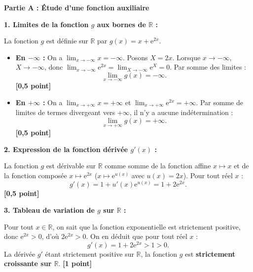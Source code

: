 \documentclass[11pt,a4paper]{article}
\newcommand{\R}{\mathbb{R}}
\newcommand{\e}{\mathrm{e}}
\begin{document}
\begin{correctionbox}
\textbf{Partie A : Étude d'une fonction auxiliaire}

\textbf{1. Limites de la fonction $g$ aux bornes de $\R$ :}

La fonction $g$ est définie sur $\R$ par $g(x) = x + \e^{2x}$.
\begin{itemize}[leftmargin=*]
    \item \textbf{En $-\infty$ :} On a $\lim_{x \to -\infty} x = -\infty$.
    Posons $X = 2x$. Lorsque $x \to -\infty$, $X \to -\infty$, donc $\lim_{x \to -\infty} \e^{2x} = \lim_{X \to -\infty} \e^X = 0$.
    Par somme des limites :
    \[
    \lim_{x \to -\infty} g(x) = -\infty.
    \] \hfill \textbf{[0{,}5 point]}
    \item \textbf{En $+\infty$ :} On a $\lim_{x \to +\infty} x = +\infty$ et $\lim_{x \to +\infty} \e^{2x} = +\infty$.
    Par somme de limites de termes divergeant vers $+\infty$, il n'y a aucune indétermination :
    \[
    \lim_{x \to +\infty} g(x) = +\infty.
    \] \hfill \textbf{[0{,}5 point]}
\end{itemize}

\medskip
\textbf{2. Expression de la fonction dérivée $g'(x)$ :}

La fonction $g$ est dérivable sur $\R$ comme somme de la fonction affine $x \mapsto x$ et de la fonction composée $x \mapsto \e^{2x}$ ($x \mapsto \e^{u(x)}$ avec $u(x) = 2x$).
Pour tout réel $x$ :
\[
g'(x) = 1 + u'(x)\e^{u(x)} = 1 + 2\e^{2x}.
\] \hfill \textbf{[0{,}5 point]}

\medskip
\textbf{3. Tableau de variation de $g$ sur $\R$ :}

Pour tout $x \in \R$, on sait que la fonction exponentielle est strictement positive, donc $\e^{2x} > 0$, d'où $2\e^{2x} > 0$.
On en déduit que pour tout réel $x$ :
\[
g'(x) = 1 + 2\e^{2x} > 1 > 0.
\]
La dérivée $g'$ étant strictement positive sur $\R$, la fonction $g$ est \textbf{strictement croissante sur $\R$}. \hfill \textbf{[1 point]}

\begin{center}
\end{center}


\end{correctionbox}
\end{document}
